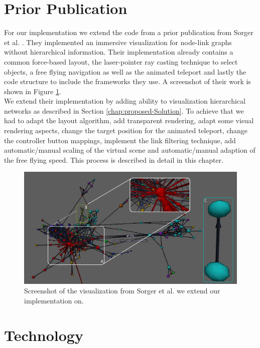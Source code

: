 \section{Prior Publication}
For our implementation we extend the code from a prior publication from Sorger et al. \cite{sorger_immersive_2019}. 
They implemented an immersive visualization for node-link graphs without hierarchical information. Their implementation already contains a common force-based layout, the laser-pointer ray casting technique to select objects, a free flying navigation as well as the animated teleport and lastly the code structure to include the frameworks they use. A screenshot of their work is shown in Figure \ref{fig:priorPublication}.\\
We extend their implementation by adding ability to visualization hierarchical networks as described in Section \ref{chap:proposed-Solution}. To achieve that we had to adapt the layout algorithm, add transparent rendering, adapt some visual rendering aspects, change the target position for the animated teleport, change the controller button mappings, implement the link filtering technique, add automatic/manual scaling of the virtual scene and automatic/manual adaption of the free flying speed.
This process is described in detail in this chapter.

\begin{figure}[!hbt]
    \centering
    \includegraphics[width=\textwidth]{graphics/screenshotPriorPublication.jpg}
    \caption{Screenshot of the visualization from Sorger et al. \cite{sorger_immersive_2019} we extend our implementation on.}
    \label{fig:priorPublication}
\end{figure}

\section{Technology}

